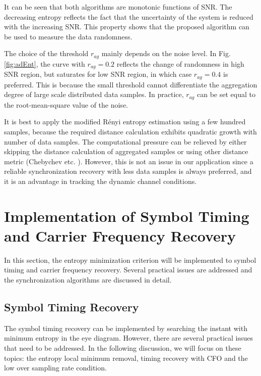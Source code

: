 \documentclass[journal,comsoc]{IEEEtran}
\begin{document}
It can be seen that both algorithms are monotonic functions of SNR.
The decreasing entropy reflects the fact that the uncertainty of the system is reduced with the increasing SNR.
This property shows that the proposed algorithm can be used to measure the data randomness.

The choice of the threshold \(r_{ag}\) mainly depends on the noise level.
In Fig. \ref{fig:adEnt}, the curve with \(r_{ag}=0.2\) reflects the change of randomness in high SNR region, but saturates for low SNR region, in which case \(r_{ag}=0.4\) is preferred.
This is because the small threshold cannot differentiate the aggregation degree of large scale distributed data samples.
In practice, $r_{ag}$ can be set equal to the root-mean-square value of the noise.

It is best to apply the modified R\'enyi entropy estimation using a few hundred samples,
because the required distance calculation exhibits quadratic growth with number of data samples. 
The computational pressure can be relieved by either skipping the distance calculation of aggregated samples or using other distance metric (Chebychev etc. \cite{Cha2007}).
However, this is not an issue in our application since a reliable synchronization  recovery with less data samples is always preferred, and it is an advantage in tracking the dynamic channel conditions. 
\section{Implementation of Symbol Timing and Carrier Frequency Recovery}
\label{sec:imple}
In this section, the entropy minimization criterion will be implemented to symbol timing and carrier frequency recovery.
Several practical issues are addressed and the
synchronization algorithms are discussed in detail. 





\subsection{Symbol Timing Recovery} 
\label{sec:timing}
The symbol timing recovery can be implemented by searching the instant with minimum entropy in the eye diagram.
However, there are several practical issues that need to be addressed.
In the following discussion, we will focus on these topics: the entropy local minimum removal, timing recovery with CFO and the low over sampling rate condition.
\end{document}
